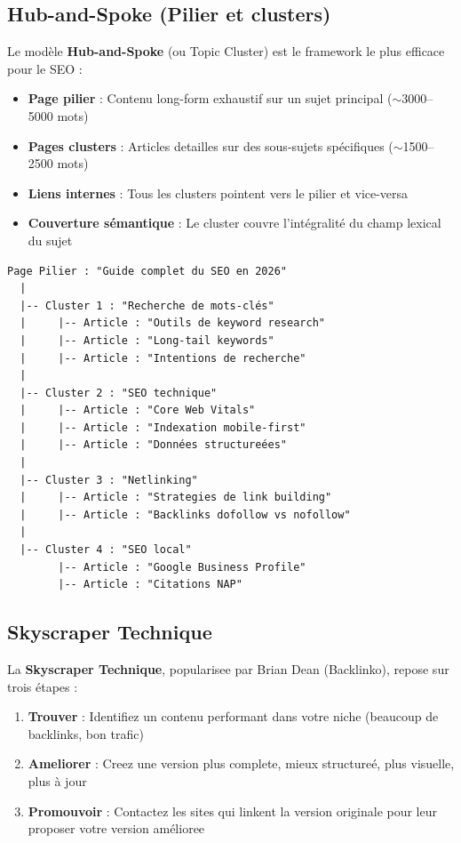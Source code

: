 \documentclass[12pt,a4paper,twoside]{report}
\newcommand{\keyword}[1]{\textbf{\textcolor{googleblue}{#1}}}
\begin{document}
\subsection{Hub-and-Spoke (Pilier et clusters)}

Le modèle \keyword{Hub-and-Spoke} (ou Topic Cluster) est le framework le plus efficace pour le SEO :

\begin{itemize}
    \item \textbf{Page pilier} : Contenu long-form exhaustif sur un sujet principal ($\sim$3000--5000 mots)
    \item \textbf{Pages clusters} : Articles detailles sur des sous-sujets spécifiques ($\sim$1500--2500 mots)
    \item \textbf{Liens internes} : Tous les clusters pointent vers le pilier et vice-versa
    \item \textbf{Couverture sémantique} : Le cluster couvre l'intégralité du champ lexical du sujet
\end{itemize}

\begin{lstlisting}[style=htmlcode,caption={Structure Hub-and-Spoke pour le SEO}]
Page Pilier : "Guide complet du SEO en 2026"
  |
  |-- Cluster 1 : "Recherche de mots-clés"
  |     |-- Article : "Outils de keyword research"
  |     |-- Article : "Long-tail keywords"
  |     |-- Article : "Intentions de recherche"
  |
  |-- Cluster 2 : "SEO technique"
  |     |-- Article : "Core Web Vitals"
  |     |-- Article : "Indexation mobile-first"
  |     |-- Article : "Données structureées"
  |
  |-- Cluster 3 : "Netlinking"
  |     |-- Article : "Strategies de link building"
  |     |-- Article : "Backlinks dofollow vs nofollow"
  |
  |-- Cluster 4 : "SEO local"
        |-- Article : "Google Business Profile"
        |-- Article : "Citations NAP"
\end{lstlisting}

\subsection{Skyscraper Technique}

La \keyword{Skyscraper Technique}, popularisee par Brian Dean (Backlinko), repose sur trois étapes :

\begin{enumerate}
    \item \textbf{Trouver} : Identifiez un contenu performant dans votre niche (beaucoup de backlinks, bon trafic)
    \item \textbf{Ameliorer} : Creez une version plus complete, mieux structureé, plus visuelle, plus à jour
    \item \textbf{Promouvoir} : Contactez les sites qui linkent la version originale pour leur proposer votre version amélioree
\end{enumerate}
\end{document}
